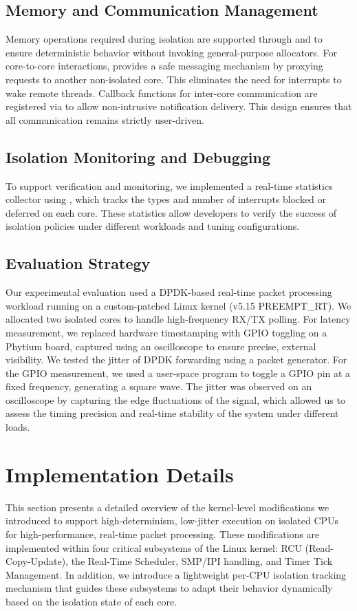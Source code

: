 \documentclass[letterpaper]{article}
\begin{document}
\subsection{Memory and Communication Management}
Memory operations required during isolation are supported through and to ensure deterministic
behavior without invoking general-purpose allocators. For core-to-core interactions, provides a
safe messaging mechanism by proxying requests to another non-isolated core. This eliminates the
need for interrupts to wake remote threads.
Callback functions for inter-core communication are registered via to allow non-intrusive
notification delivery. This design ensures that all communication remains strictly user-driven.

\subsection{Isolation Monitoring and Debugging}
To support verification and monitoring, we implemented a real-time statistics collector using ,
which tracks the types and number of interrupts blocked or deferred on each core. These statistics
allow developers to verify the success of isolation policies under different workloads and tuning
configurations.

\subsection{Evaluation Strategy}
Our experimental evaluation used a DPDK-based real-time packet processing workload running on
a custom-patched Linux kernel (v5.15 PREEMPT\_RT). We allocated two isolated cores to handle
high-frequency RX/TX polling. For latency measurement, we replaced hardware timestamping
with GPIO toggling on a Phytium board, captured using an oscilloscope to ensure precise,
external visibility.
We tested the jitter of DPDK forwarding using a packet generator.
For the GPIO measurement, we used a user-space program to toggle a GPIO pin at a fixed
frequency, generating a square wave. The jitter was observed on an oscilloscope by capturing the
edge fluctuations of the signal, which allowed us to assess the timing precision and real-time
stability of the system under different loads.


\section{Implementation Details}
This section presents a detailed overview of the kernel-level modifications we introduced to
support high-determinism, low-jitter execution on isolated CPUs for high-performance, real-time
packet processing. These modifications are implemented within four critical subsystems of the
Linux kernel: RCU (Read-Copy-Update), the Real-Time Scheduler, SMP/IPI handling, and Timer Tick
Management. In addition, we introduce a lightweight per-CPU isolation tracking mechanism that
guides these subsystems to adapt their behavior dynamically based on the isolation state of each
core.
\end{document}
